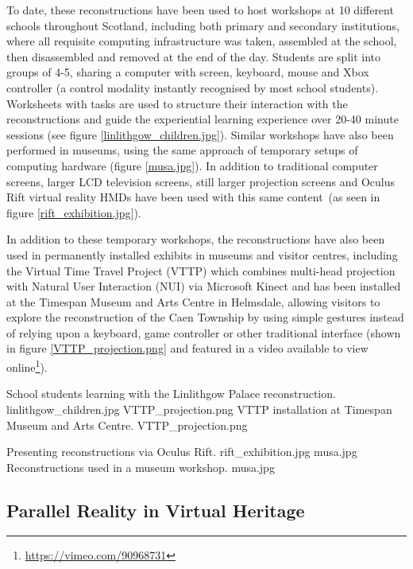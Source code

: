 To date, these reconstructions have been used to host workshops at 10 different schools throughout Scotland, including both primary and secondary institutions, where all requisite computing infrastructure was taken, assembled at the school, then disassembled and removed at the end of the day. Students are split into groups of 4-5, sharing a computer with screen, keyboard, mouse and Xbox controller (a control modality instantly recognised by most school students). Worksheets with tasks are used to structure their interaction with the reconstructions and guide the experiential learning experience over 20-40 minute sessions (see figure \ref{linlithgow_children.jpg}). Similar workshops have also been performed in museums, using the same approach of temporary setups of computing hardware (figure \ref{musa.jpg}). In addition to traditional computer screens, larger LCD television screens, still larger projection screens and Oculus Rift virtual reality HMDs have been used with this same content~(as seen in figure \ref{rift_exhibition.jpg}).

In addition to these temporary workshops, the reconstructions have also been used in permanently installed exhibits in museums and visitor centres, including the Virtual Time Travel Project (VTTP) which combines multi-head projection with Natural User Interaction (NUI) via Microsoft Kinect and has been installed at the Timespan Museum and Arts Centre in Helmsdale, allowing visitors to explore the reconstruction of the Caen Township by using simple gestures instead of relying upon a keyboard, game controller or other traditional interface (shown in figure \ref{VTTP_projection.png} and featured in a video available to view online\footnote{\url{https://vimeo.com/90968731}}).

 {School students learning with the Linlithgow Palace reconstruction.} {linlithgow_children.jpg}
       {VTTP_projection.png} {VTTP installation at Timespan Museum and Arts Centre.} {VTTP_projection.png}

 {Presenting reconstructions via Oculus Rift.} {rift_exhibition.jpg}
       {musa.jpg} {Reconstructions used in a museum workshop.} {musa.jpg}


\subsection{Parallel Reality in Virtual Heritage}

